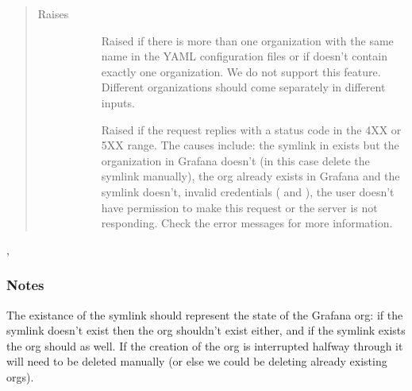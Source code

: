\documentclass[letterpaper,10pt,english]{sphinxmanual}
\begin{document}
\begin{fulllineitems}
\begin{quote}
\begin{description}
\begin{description}
\end{description}

\item[{Raises}] \leavevmode\begin{description}
\item[{}] \leavevmode
Raised if there is more than one organization with the same name in the
YAML configuration files or if  doesn’t contain exactly one
organization. We do not support this feature. Different organizations
should come separately in different inputs.

\item[{}] \leavevmode
Raised if the request replies with a status code in the 4XX or 5XX range.
The causes include: the symlink in  exists but the organization in
Grafana doesn’t (in this case delete the symlink manually), the org already
exists in Grafana and the symlink doesn’t, invalid credentials ( and
), the user doesn’t have permission to make this request or the
server is not responding. Check the error messages for more information.

\end{description}

\end{description}\end{quote}




{\hyperref[\detokenize{grafanaAPI:grafanaAPI.getOrgId}]{}}, {\hyperref[\detokenize{grafanaAPI:grafanaAPI.createOrg}]{}}


\subsubsection*{Notes}

The existance of the symlink should represent the state of the Grafana org: if
the symlink doesn’t exist then the org shouldn’t exist either, and if the 
symlink exists the org should as well. If the creation of the org is
interrupted halfway through it will need to be deleted manually (or else we
could be deleting already existing orgs).

\end{fulllineitems}
\end{document}

